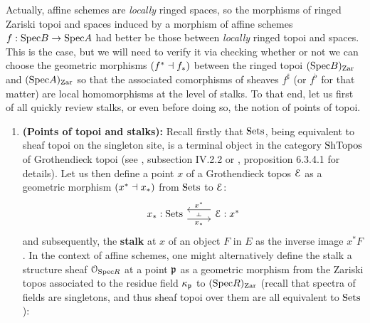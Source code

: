                 \begin{remark} \label{remark: affine_scheme_morphisms}
                    Actually, affine schemes are \textit{locally} ringed spaces, so the morphisms of ringed Zariski topoi and spaces induced by a morphism of affine schemes $f: \mathrm{Spec} B \to \mathrm{Spec} A$ had better be those between \textit{locally} ringed topoi and spaces. This is the case, but we will need to verify it via checking whether or not we can choose the geometric morphisms $(f^* \dashv f_*)$ between the ringed topoi $(\mathrm{Spec} B)_{\mathrm{Zar}}$ and $(\mathrm{Spec} A)_{\mathrm{Zar}}$ so that the associated comorphisms of sheaves $f^{\sharp}$ (or $f^{\flat}$ for that matter) are local homomorphisms at the level of stalks. To that end, let us first of all quickly review stalks, or even before doing so, the notion of points of topoi.
                        \begin{enumerate}
                            \item \textbf{(Points of topoi and stalks):} Recall firstly that $\mathrm{Sets}$, being equivalent to sheaf topoi on the singleton site, is a terminal object in the category $\mathrm{Sh}\mathrm{Topos}$ of Grothendieck topoi (see \cite{sga4}, subsection IV.2.2 or \cite{HTT}, proposition 6.3.4.1 for details). Let us then define a point $x$ of a Grothendieck topos $\mathcal{E}$ as a geometric morphism $(x^* \dashv x_*)$ from $\mathrm{Sets}$ to $\mathcal{E}$:
                                $$
                                    \begin{tikzcd}
                                    	{x_*: \Sets} & {\E: x^*}
                                    	\arrow[""{name=0, anchor=center, inner sep=0}, "x_*"', shift right=2, from=1-1, to=1-2]
                                    	\arrow[""{name=1, anchor=center, inner sep=0}, "x^*"', shift right=2, from=1-2, to=1-1]
                                    	\arrow["\dashv"{anchor=center, rotate=-90}, draw=none, from=1, to=0]
                                    \end{tikzcd}
                                $$
                            and subsequently, the \textbf{stalk} at $x$ of an object $F$ in $E$ as the inverse image $x^*F$. In the context of affine schemes, one might alternatively define the stalk a structure sheaf $\mathcal{O}_{\mathrm{Spec} R}$ at a point $\mathfrak{p}$ as a geometric morphism from the Zariski topos associated to the residue field $\kappa_{\mathfrak{p}}$ to $(\mathrm{Spec} R)_{\mathrm{Zar}}$ (recall that spectra of fields are singletons, and thus sheaf topoi over them are all equivalent to $\mathrm{Sets}$):

\end{enumerate}
\end{remark}
